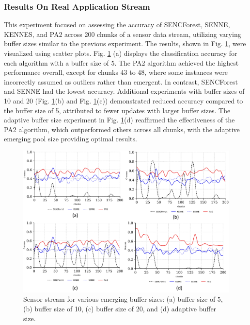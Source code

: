 \subsubsection{Results On Real Application Stream}
\label{sec:sensor}
This experiment focused on assessing the accuracy of SENCForest, SENNE, KENNES, and PA2 across 200 chunks of a sensor data stream, utilizing varying buffer sizes similar to the previous experiment. The results, shown in Fig. \ref{fig:res2}, were visualized using scatter plots. Fig. \ref{fig:res2} (a) displays the classification accuracy for each algorithm with a buffer size of 5. The PA2 algorithm achieved the highest performance overall, except for chunks 43 to 48, where some instances were incorrectly assumed as outliers rather than emergent. In contrast, SENCForest and SENNE had the lowest accuracy. Additional experiments with buffer sizes of 10 and 20 (Fig. \ref{fig:res2}(b) and Fig. \ref{fig:res2}(c)) demonstrated reduced accuracy compared to the buffer size of 5, attributed to fewer updates with larger buffer sizes. The adaptive buffer size experiment in Fig. \ref{fig:res2}(d) reaffirmed the effectiveness of the PA2 algorithm, which outperformed others across all chunks, with the adaptive emerging pool size providing optimal results.

\begin{figure}[!ht]
	\centering
	\includegraphics[width=1\linewidth]{5_Emerging/images/res2.png}
	\caption{Sensor stream for various emerging buffer sizes: (a) buffer size of 5, (b) buffer size of 10, (c) buffer size of 20, and (d) adaptive buffer size.}

	\label{fig:res2}
\end{figure}				

